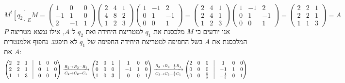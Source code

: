 \[
	M^t [q_2]_E M
	= \begin{pmatrix}
		1 & 0 & 0 \\
		-1 & 1 & 0 \\
		2 & -1 & 1
	\end{pmatrix}
	\begin{pmatrix}
		2 & 4 & 1 \\
		4 & 8 & 2 \\
		1 & 2 & 3
	\end{pmatrix}
	\begin{pmatrix}
		1 & -1 & 2 \\
		0 & 1 & -1 \\
		0 & 0 & 1
	\end{pmatrix}
	= \begin{pmatrix}
		2 & 4 & 1 \\
		2 & 4 & 1 \\
		1 & 2 & 3
	\end{pmatrix}
	\begin{pmatrix}
		1 & -1 & 2 \\
		0 & 1 & -1 \\
		0 & 0 & 1
	\end{pmatrix}
	= \begin{pmatrix}
		2 & 2 & 1 \\
		2 & 2 & 1 \\
		1 & 1 & 3
	\end{pmatrix}
	= A
\]
אנו יודעים כי $M$ מלכסנת את $q_1$ למטריצת היחידה ואת $q_2$ ל־$A$, אילו נמצא מטריצה $P$ המלכסנת את $A$ בשל החפיפה למטריצת היחידה החפיפה של $q_1$ לא תיפגע.
נחפוף אלמנטרית את $A$:
\[
	\begin{pmatrix}
		2 & 2 & 1 & \vline & 1 & 0 & 0 \\
		2 & 2 & 1 & \vline & 0 & 1 & 0 \\
		1 & 1 & 3 & \vline & 0 & 0 & 1
	\end{pmatrix}
	\xrightarrow[C_2 \to C_2 - C_1]{R_2 \to R_2 - R_1}
	\begin{pmatrix}
		2 & 0 & 1 & \vline & 1 & 0 & 0 \\
		0 & 0 & 0 & \vline & -1 & 1 & 0 \\
		1 & 0 & 3 & \vline & 0 & 0 & 1
	\end{pmatrix}
	\xrightarrow[C_3 \to C_3 - \frac{1}{2}C_1]{R_3 \to R_3 - \frac{1}{2}R_1}
	\begin{pmatrix}
		2 & 0 & 0 & \vline & 1 & 0 & 0 \\
		0 & 0 & 0 & \vline & -1 & 1 & 0 \\
		0 & 0 & \frac{5}{2} & \vline & -\frac{1}{2} & 0 & 1
	\end{pmatrix}
\]
